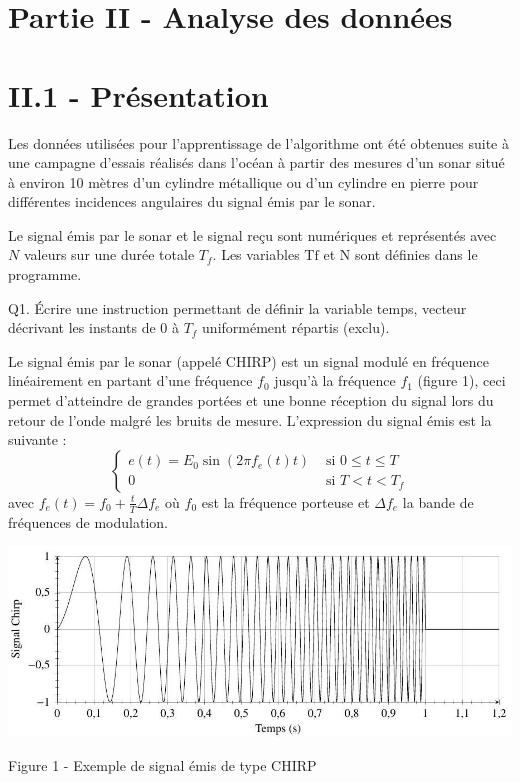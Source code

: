 \documentclass[10pt]{article}
\begin{document}
\section*{Partie II - Analyse des données }
\section{II.1 - Présentation}
Les données utilisées pour l'apprentissage de l'algorithme ont été obtenues suite à une campagne d'essais réalisés dans l'océan à partir des mesures d'un sonar situé à environ 10 mètres d'un cylindre métallique ou d'un cylindre en pierre pour différentes incidences angulaires du signal émis par le sonar.

Le signal émis par le sonar et le signal reçu sont numériques et représentés avec $N$ valeurs sur une durée totale $T_{f}$. Les variables $\mathrm{Tf}$ et $\mathrm{N}$ sont définies dans le programme.

Q1. Écrire une instruction permettant de définir la variable temps, vecteur décrivant les instants de 0 à $T_{f}$ uniformément répartis (exclu).

Le signal émis par le sonar (appelé CHIRP) est un signal modulé en fréquence linéairement en partant d'une fréquence $f_{0}$ jusqu'à la fréquence $f_{1}$ (figure 1), ceci permet d'atteindre de grandes portées et une bonne réception du signal lors du retour de l'onde malgré les bruits de mesure. L'expression du signal émis est la suivante :
$$
\begin{cases}e(t)=E_{0} \sin \left(2 \pi f_{e}(t) t\right) & \text { si } 0 \leq t \leq T \\ 0 & \text { si } T<t<T_{f}\end{cases}
$$
avec $f_{e}(t)=f_{0}+\frac{t}{T} \Delta f_{e}$ où $f_{0}$ est la fréquence porteuse et $\Delta f_{e}$ la bande de fréquences de modulation.

\includegraphics[max width=\textwidth]{2022_02_02_1af495ea60fb42b668bfg-03}

Figure 1 - Exemple de signal émis de type CHIRP
\end{document}
